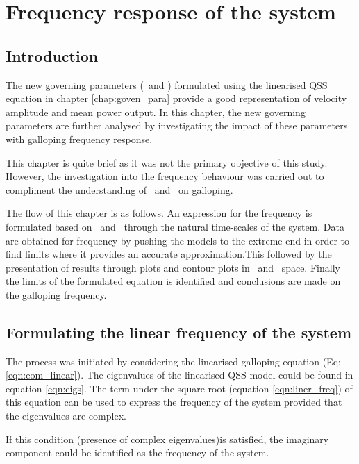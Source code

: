 \chapter{Frequency response of the system}

\section{Introduction}

The new governing parameters (\massstiff\ and \massdamp) formulated using the linearised QSS equation in chapter \ref{chap:goven_para} provide a good representation of velocity amplitude and mean power output. In this chapter, the new governing parameters are further analysed by investigating the impact of these parameters with galloping frequency response. 

This chapter is quite brief as it was not the primary objective of this study. However, the investigation into the frequency behaviour was carried out to compliment the understanding of \massstiff\ and \massdamp\ on galloping. 

The flow of this chapter is as follows. An expression for the frequency is formulated based on \massstiff\ and \massdamp\ through the natural time-scales of the system. Data are obtained for frequency by pushing the models to the extreme end in order to find limits where it provides an accurate approximation.This followed by the presentation of results through plots and contour plots in \massstiff\ and \massdamp\ space. Finally the limits of the formulated equation is identified and conclusions are made on the galloping frequency. 


\vspace{15mm}

\section{Formulating the linear frequency of the system}

The process was initiated by considering the linearised galloping equation (Eq:\ref{eqn:eom_linear}). The eigenvalues of the linearised QSS model could be found in equation \ref{eqn:eigs}. The term under the square root (equation \ref{eqn:liner_freq}) of this equation can be used to express the frequency of the system provided that the eigenvalues are complex. 

If this condition (presence of complex eigenvalues)is satisfied, the imaginary component could be identified as the frequency of the system. 

